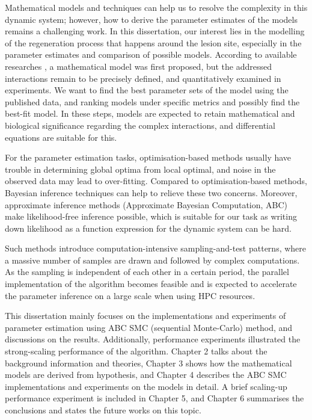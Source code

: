Mathematical models and techniques can help us to resolve the complexity in this dynamic system; however, how to derive the parameter estimates of the models remains a challenging work. In this dissertation, our interest lies in the modelling of the regeneration process that happens around the lesion site, especially in the parameter estimates and comparison of possible models. According to available researches \cite{ref:Tsarouchas}, a mathematical model was first proposed, but the addressed interactions remain to be precisely defined, and quantitatively examined in experiments. We want to find the best parameter sets of the model using the published data, and ranking models under specific metrics and possibly find the best-fit model. In these steps, models are expected to retain mathematical and biological significance regarding the complex interactions, and differential equations are suitable for this.


For the parameter estimation tasks, optimisation-based methods usually have trouble in determining global optima from local optimal, and noise in the observed data may lead to over-fitting. Compared to optimisation-based methods, Bayesian inference techniques can help to relieve these two concerns\cite{ref:abcsysbio}. Moreover, approximate inference methods (Approximate Bayesian Computation, ABC) make likelihood-free inference possible, which is suitable for our task as writing down likelihood as a function expression for the dynamic system can be hard.

Such methods introduce computation-intensive sampling-and-test patterns, where a massive number of samples are drawn and followed by complex computations. As the sampling is independent of each other in a certain period, the parallel implementation of the algorithm becomes feasible and is expected to accelerate the parameter inference on a large scale when using HPC resources.

This dissertation mainly focuses on the implementations and experiments of parameter estimation using ABC SMC (sequential Monte-Carlo) method, and discussions on the results. Additionally, performance experiments illustrated the strong-scaling performance of the algorithm. Chapter 2 talks about the background information and theories, Chapter 3 shows how the mathematical models are derived from hypothesis, and Chapter 4 describes the ABC SMC implementations and experiments on the models in detail. A brief scaling-up performance experiment is included in Chapter 5, and Chapter 6 summarises the conclusions and states the future works on this topic.
